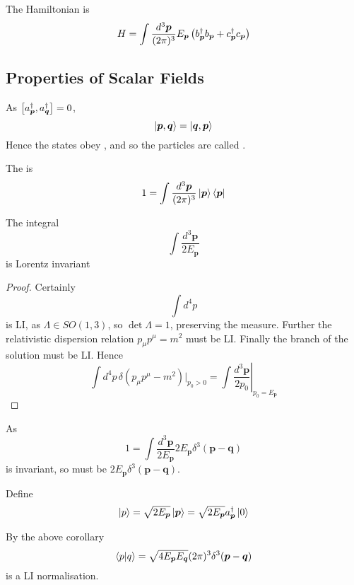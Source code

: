 \documentclass{article}
\begin{document}
\begin{theorem}
The Hamiltonian is 
\[
H = \int\tmeas E_{\bm{p}} \left( b_{\bm{p}}^\dagger b_{\bm{p}} + c_{\bm{p}}^\dagger c_{\bm{p}} \right)
\]
\end{theorem}
\subsection{Properties of Scalar Fields}

\begin{theorem}
As $\comm[a_{\bm{p}}^\dagger]{a_{\bm{q}}^\dagger}=0$,
\[
\ket{\bm{p},\bm{q}}=\ket{\bm{q},\bm{p}}
\]
Hence the states obey , and so the particles are called .
\end{theorem}


\begin{definition}
The  is 
\[
1=\int \tmeas \ket{\bm{p}}\bra{\bm{p}}
\]
\end{definition}

\begin{theorem}
The integral 
\[
\int \frac{d^3 \bm{p}}{2E_{\bm{p}}}
\]
is Lorentz invariant
\end{theorem}
\begin{proof}
Certainly 
\[
\int d^4 p 
\]
is LI, as $\Lambda\in SO(1,3)$, so $\det\Lambda=1$, preserving the measure. Further the relativistic dispersion relation $p_\mu p^\mu=m^2$ must be LI. Finally the branch of the solution must be LI. Hence 
\[
\int d^4p \, \delta(p_\mu p^\mu-m^2)|_{p_0>0} = \int \left. \frac{d^3\bm{p}}{2p_0} \right|_{p_0=E_{\bm{p}}}
\]
\end{proof}

\begin{corollary}
As 
\[
1=\int \frac{d^3 \bm{p}}{2E_{\bm{p}}} 2E_{\bm{p}} \delta^3(\bm{p}-\bm{q})
\]
is invariant, so must be $2E_{\bm{p}} \delta^3(\bm{p}-\bm{q})$.
\end{corollary}

\begin{definition}
Define 
\[
\ket{p}=\sqrt{2E_{\bm{p}}}\ket{\bm{p}}=\sqrt{2E_{\bm{p}}}a_{\bm{p}}^\dagger \ket{0}
\]
\end{definition}

\begin{idea}
By the above corollary 
\[
\braket{p|q}=\sqrt{4E_{\bm{p}}E_{\bm{q}}}(2\pi)^3 \delta^3(\bm{p}-\bm{q})
\]
is a LI normalisation. 
\end{idea}
\end{document}

